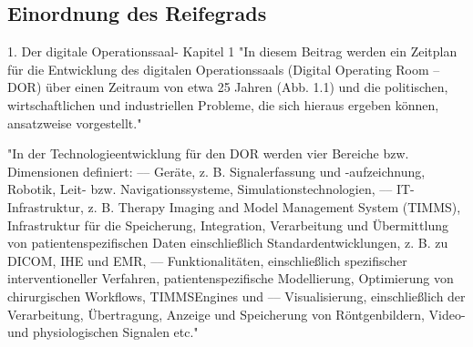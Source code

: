 	
\subsection{Einordnung des Reifegrads}
1. Der digitale Operationssaal- Kapitel 1
	"In diesem Beitrag werden ein Zeitplan für die Entwicklung
	des digitalen Operationssaals (Digital Operating Room – DOR) über einen Zeitraum
	von etwa 25 Jahren (Abb. 1.1) und die politischen, wirtschaftlichen und industriellen
	Probleme, die sich hieraus ergeben können, ansatzweise vorgestellt."

	"In der Technologieentwicklung für den DOR werden vier Bereiche bzw. Dimensionen
	definiert:
	–– Geräte, z. B. Signalerfassung und -aufzeichnung, Robotik, Leit- bzw. Navigationssysteme,
	Simulationstechnologien,
	–– IT-Infrastruktur, z. B. Therapy Imaging and Model Management System (TIMMS),
	Infrastruktur für die Speicherung, Integration, Verarbeitung und Übermittlung
	von patientenspezifischen Daten einschließlich Standardentwicklungen, z. B. zu
	DICOM, IHE und EMR,
	–– Funktionalitäten, einschließlich spezifischer interventioneller Verfahren, patientenspezifische
	Modellierung, Optimierung von chirurgischen Workflows, TIMMSEngines
	und
	–– Visualisierung, einschließlich der Verarbeitung, Übertragung, Anzeige und Speicherung
	von Röntgenbildern, Video- und physiologischen Signalen etc."

